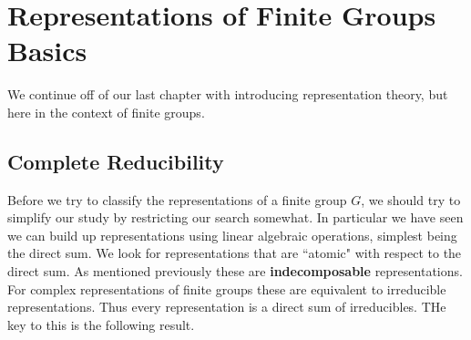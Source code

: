 %
%
%
\chapter{Representations of Finite Groups Basics}
\label{BasicsFin} %

We continue off of our last chapter with introducing representation theory, but here in the context of finite groups.

\section{Complete Reducibility}

Before we try to classify the representations of a finite group $G$, we should try to simplify our study by restricting our search somewhat. In particular we have seen we can build up representations using linear algebraic operations, simplest being the direct sum. We look for representations that are ``atomic" with respect to the direct sum. As mentioned previously these are \textbf{indecomposable} representations. For complex representations of finite groups these are equivalent to irreducible representations. Thus every representation is a direct sum of irreducibles. THe key to this is the following result.


